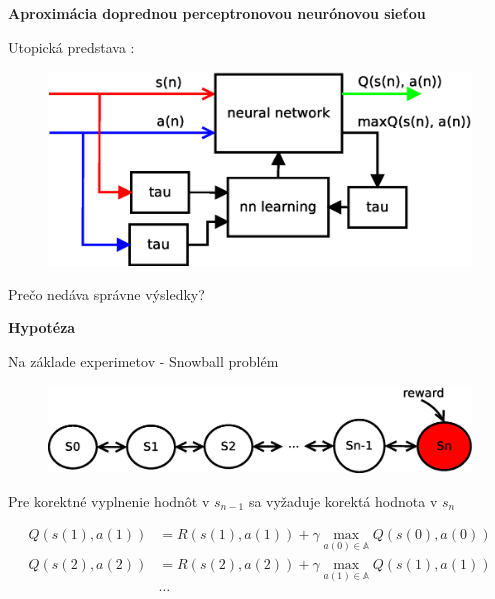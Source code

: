 \documentclass[xcolor=dvipsnames]{beamer}
\begin{document}
\begin{frame}{\bf Aproximácia doprednou perceptronovou neurónovou sieťou}

Utopická predstava :

\begin{figure}[!htb]
\includegraphics[scale=.5]{../diagrams/q_learning_nn.eps}
\end{figure}

Prečo nedáva správne výsledky?
\end{frame}

\begin{frame}{\bf Hypotéza}

Na základe experimetov - Snowball problém

\begin{figure}[!htb]
\includegraphics[scale=.5]{../diagrams/q_chain_problem.eps}
\end{figure}

Pre korektné vyplnenie hodnôt v $s_{n-1}$ sa vyžaduje korektá hodnota v $s_{n}$

\begin{align*}
    Q(s(1),a(1)) &= R(s(1),a(1)) + \gamma \max_{a(0) \in \mathbb{A}} Q(s(0), a(0)) \\
    Q(s(2),a(2)) &= R(s(2),a(2)) + \gamma \max_{a(1) \in \mathbb{A}} Q(s(1), a(1)) \\
    & \dots
\end{align*}

\end{frame}
\end{document}
